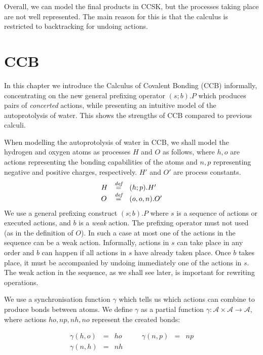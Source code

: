 \documentclass[runningheads]{llncs}
\newcommand{\bydef}{\stackrel{\emph{def}}{=}}
\begin{document}
Overall, we can model the final products in CCSK, but the processes taking place are not well represented. The main reason for this is that the calculus is restricted to backtracking for undoing actions.

\section{CCB}
\label{sec:ccb}

In this chapter we introduce the Calculus of Covalent Bonding (CCB) \cite{KUHN201818} informally, concentrating on the new general 
prefixing operator $(s;b).P$ which produces pairs of \emph{concerted} actions,
while presenting an intuitive model of the autoprotolysis of water. This shows the strengths of CCB compared to previous calculi.

When modelling the autoprotolysis of water in CCB, we shall model the hydrogen and oxygen atoms as processes $H$ and $O$ as follows, where 
$h,o$ are actions representing the bonding capabilities of the atoms and $n,p$ 
representing negative and positive charges, respectively. $H'$ and $O'$ are process constants.
$$\begin{array}{lll}
H & \bydef & (h;p).H'\\
O & \bydef & (o,o,n).O'
\end{array}$$
We use a general prefixing construct $(s;b).P$ where $s$ is a sequence of actions or executed 
actions, and $b$ is a \emph{weak} action. The prefixing operator must not used (as in the definition of $O$). In such a case at most one of the actions in the sequence can be a weak action. Informally, actions in $s$ can take place in any order 
and $b$ can happen if
all actions in $s$ have already taken place. Once $b$ takes place, it must be accompanied by
undoing immediately one of the actions in $s$. The weak action in the sequence, as we shall see later, is important for rewriting operations.  

We use a synchronisation function $\gamma$ which tells us which actions can combine to 
produce bonds between atoms. We define $\gamma$ 
as a partial function $\gamma: \mathcal A \times \mathcal A \rightarrow \mathcal A$, where actions $ho, np, nh, no$ represent the created bonds:

$$\begin{array}{llllll}
\gamma(h,o) & = & ho \qquad &
\gamma(n,p) & = & np\\
\gamma(n,h) & = & nh &
\end{array}$$
\end{document}

